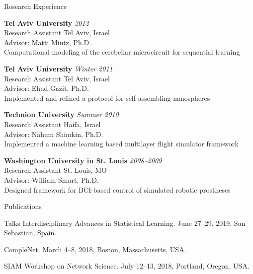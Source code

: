 \documentclass{resume} %
\begin{document}
\begin{rSection}{Research Experience}


\textbf{Tel Aviv University} \hfill \emph{2012} \\
Research Assistant \hfill Tel Aviv, Israel \\
Advisor: Matti Mintz, Ph.D. \\
Computational modeling of the cerebellar microcircuit for sequential learning

\textbf{Tel Aviv University} \hfill \emph{Winter 2011} \\
Research Assistant \hfill Tel Aviv, Israel \\
Advisor: Ehud Gazit, Ph.D. \\
Implemented and refined a protocol for self-assembling nanospheres

\textbf{Technion University} \hfill \emph{Summer 2010} \\
Research Assistant \hfill Haifa, Israel \\
Advisor: Nahum Shimkin, Ph.D. \\
Implemented a machine learning based multilayer flight simulator framework

\textbf{Washington University in St. Louis} \hfill \emph{2008--2009} \\
Research Assistant \hfill St. Louis, MO \\
Advisor: William Smart, Ph.D. \\
Designed framework for BCI-based control of simulated robotic prostheses

\end{rSection}


\begin{rSection}{Publications}
\nocite{*}
\printbibliography[heading=none]
\end{rSection}

\begin{rSection}{Talks}
Interdisciplinary Advances in Statistical Learning. June 27--29, 2019, San Sebastian, Spain.

CompleNet. March 4--8, 2018, Boston, Massachusetts, USA.

SIAM Workshop on Network Science. July 12--13, 2018, Portland, Oregon, USA.
\end{rSection}
\end{document}

